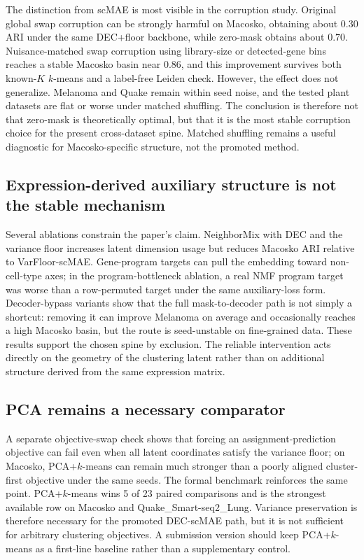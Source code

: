 \documentclass[11pt]{article}
\begin{document}
The distinction from scMAE is most visible in the corruption study. Original global swap corruption can be strongly harmful on Macosko, obtaining about $0.30$ ARI under the same DEC+floor backbone, while zero-mask obtains about $0.70$. Nuisance-matched swap corruption using library-size or detected-gene bins reaches a stable Macosko basin near $0.86$, and this improvement survives both known-$K$ $k$-means and a label-free Leiden check. However, the effect does not generalize. Melanoma and Quake remain within seed noise, and the tested plant datasets are flat or worse under matched shuffling. The conclusion is therefore not that zero-mask is theoretically optimal, but that it is the most stable corruption choice for the present cross-dataset spine. Matched shuffling remains a useful diagnostic for Macosko-specific structure, not the promoted method.

\subsection{Expression-derived auxiliary structure is not the stable mechanism}

Several ablations constrain the paper's claim. NeighborMix with DEC and the variance floor increases latent dimension usage but reduces Macosko ARI relative to VarFloor-scMAE. Gene-program targets can pull the embedding toward non-cell-type axes; in the program-bottleneck ablation, a real NMF program target was worse than a row-permuted target under the same auxiliary-loss form. Decoder-bypass variants show that the full mask-to-decoder path is not simply a shortcut: removing it can improve Melanoma on average and occasionally reaches a high Macosko basin, but the route is seed-unstable on fine-grained data. These results support the chosen spine by exclusion. The reliable intervention acts directly on the geometry of the clustering latent rather than on additional structure derived from the same expression matrix.

\subsection{PCA remains a necessary comparator}

A separate objective-swap check shows that forcing an assignment-prediction objective can fail even when all latent coordinates satisfy the variance floor; on Macosko, PCA+$k$-means can remain much stronger than a poorly aligned cluster-first objective under the same seeds. The formal benchmark reinforces the same point. PCA+$k$-means wins 5 of 23 paired comparisons and is the strongest available row on Macosko and Quake\_Smart-seq2\_Lung. Variance preservation is therefore necessary for the promoted DEC-scMAE path, but it is not sufficient for arbitrary clustering objectives. A submission version should keep PCA+$k$-means as a first-line baseline rather than a supplementary control.
\end{document}
